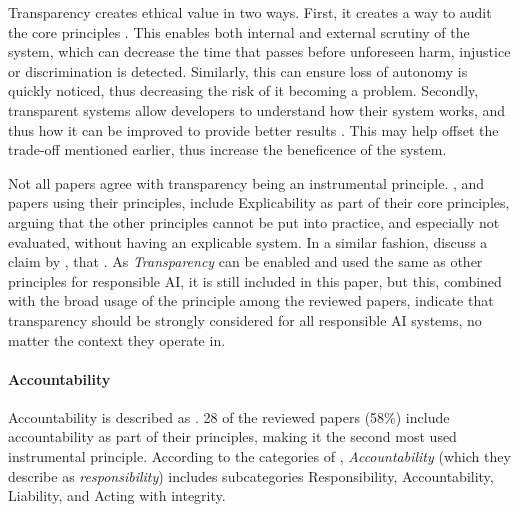 Transparency creates ethical value in two ways. First, it creates a way to audit the core principles \parencite{Canca_2020}. This enables both internal and external scrutiny of the system, which can decrease the time that passes before unforeseen harm, injustice or discrimination is detected. Similarly, this can ensure loss of autonomy is quickly noticed, thus decreasing the risk of it becoming a problem. Secondly, transparent systems allow developers to understand how their system works, and thus how it can be improved to provide better results \parencite{BarredoArrieta_2020}. This may help offset the trade-off mentioned earlier, thus increase the beneficence of the system.

Not all papers agree with transparency being an instrumental principle. \textcite{Floridi_2018}, and papers using their principles, include Explicability as part of their core principles, arguing that the other principles cannot be put into practice, and especially not evaluated, without having an explicable system. In a similar fashion, \textcite{Jobin_2019} discuss a claim by \textcite{Turilli_2009}, that  \parencite[p.~105]{Turilli_2009}. As \textit{Transparency} can be enabled and used the same as other principles for responsible AI, it is still included in this paper, but this, combined with the broad usage of the principle among the reviewed papers, indicate that transparency should be strongly considered for all responsible AI systems, no matter the context they operate in.


\paragraph{Accountability}
Accountability is described as  \parencite[p.~36]{Anagnostou_2022}. 28 of the reviewed papers (58\%) include accountability as part of their principles, making it the second most used instrumental principle. According to the categories of \textcite{Ryan_2021}, \textit{Accountability} (which they describe as \textit{responsibility}) includes subcategories Responsibility, Accountability, Liability, and Acting with integrity.

